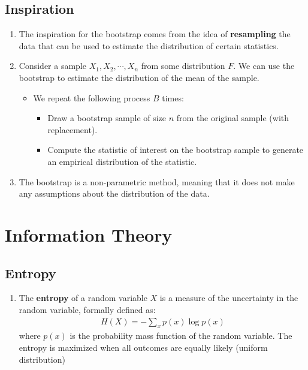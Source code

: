 \documentclass[letterpaper, 11pt]{article}
\newcommand{\1}{\mathds{1}}	%
\theoremstyle{definition}
\begin{document}
\subsection{Inspiration}
\begin{enumerate}
    \item The inspiration for the bootstrap comes from the idea of \textbf{resampling} the data 
    that can be used to estimate the distribution of certain statistics.
    \item Consider a sample $X_1, X_2, \cdots, X_n$ from some distribution $F$. We can use the bootstrap to estimate the distribution of the mean of the sample.
    \begin{itemize}
        \item We repeat the following process $B$ times:
        \begin{itemize}
            \item Draw a bootstrap sample of size $n$ from the original sample (with replacement).
            \item Compute the statistic of interest on the bootstrap sample to generate an empirical distribution of the statistic.
        \end{itemize}
    \end{itemize}
    \item The bootstrap is a non-parametric method, meaning that it does not make any assumptions about the distribution of the data.
    

\end{enumerate}

\section{Information Theory}
\subsection{Entropy}
\begin{enumerate}
    \item The \textbf{entropy} of a random variable $X$ is a measure of the uncertainty in the random variable, formally defined as:
    \begin{align}
        H(X) = -\sum_{x} p(x) \log p(x)
    \end{align}
    where $p(x)$ is the probability mass function of the random variable. The entropy is maximized when all outcomes are equally likely (uniform distribution)
\end{enumerate}
\end{document}
